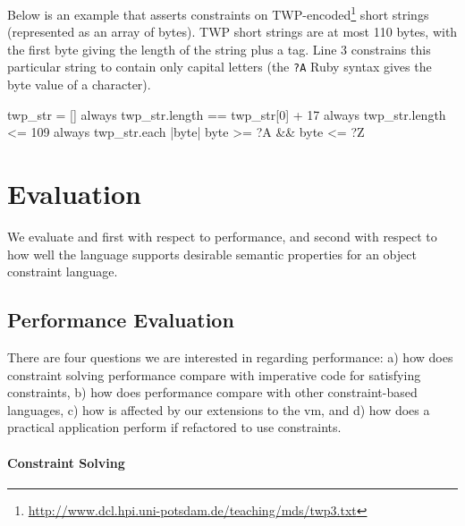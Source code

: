 Below is an example that asserts constraints on
\textsc{TWP}-encoded\footnote{\url{http://www.dcl.hpi.uni-potsdam.de/teaching/mds/twp3.txt}}
short strings (represented as an array of bytes). \textsc{TWP} short
strings are at most 110 bytes, with the first byte giving the length
of the string plus a tag. Line 3 constrains this particular string to
contain only capital letters (the \lstinline{?A} Ruby syntax gives the
byte value of a character).
\begin{code}
twp_str = []
always { twp_str.length == twp_str[0] + 17 }
always { twp_str.length <= 109 }
always { twp_str.each {|byte| byte >= ?A && byte <= ?Z} }
\end{code}

\section{Evaluation}
\label{sec:evaluation}

We evaluate \langname and \toolname first with respect to performance,
and second with respect to how well the language supports desirable
semantic properties for an object constraint language.

\subsection{Performance Evaluation}
\label{sec:performance-evaluation}

There are four questions we are interested in regarding performance:
a) how does constraint solving performance compare with imperative
code for satisfying constraints, b) how does \toolname performance
compare with other constraint-based languages, c) how is \DIFdelbegin {}\DIFdelend \DIFaddbegin {}\DIFaddend affected by our extensions to the
\ac{vm}, and d) how does a practical application perform if refactored
to use constraints.

\paragraph{Constraint Solving}

